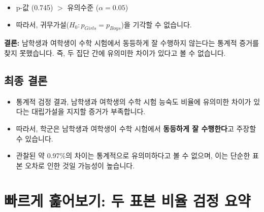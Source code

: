 \documentclass[11pt,a4paper]{book}
\theoremstyle{definition}
\begin{document}
\begin{summarybox}[title=p-값 해석:]
\begin{itemize}
    \item p-값 (0.745) $>$ 유의수준 ($\alpha=0.05$)
    \item 따라서, 귀무가설($H_0: p_{Girls} = p_{Boys}$)을 기각할 수 없습니다.
\end{itemize}
\textbf{결론:} 남학생과 여학생이 수학 시험에서 동등하게 잘 수행하지 않는다는 통계적 증거를 찾지 못했습니다. 즉, 두 집단 간에 유의미한 차이가 있다고 볼 수 없습니다.
\end{summarybox}

\subsection{최종 결론}

\begin{summarybox}[title=종합 결론:]
\begin{itemize}
    \item 통계적 검정 결과, 남학생과 여학생의 수학 시험 능숙도 비율에 유의미한 차이가 있다는 대립가설을 지지할 증거가 부족합니다.
    \item 따라서, 학군은 남학생과 여학생이 수학 시험에서 \textbf{동등하게 잘 수행한다}고 주장할 수 있습니다.
    \item 관찰된 약 0.97\%의 차이는 통계적으로 유의미하다고 볼 수 없으며, 이는 단순한 표본 오차로 인한 것일 가능성이 높습니다.
\end{itemize}
\end{summarybox}


\section{빠르게 훑어보기: 두 표본 비율 검정 요약}
\end{document}
